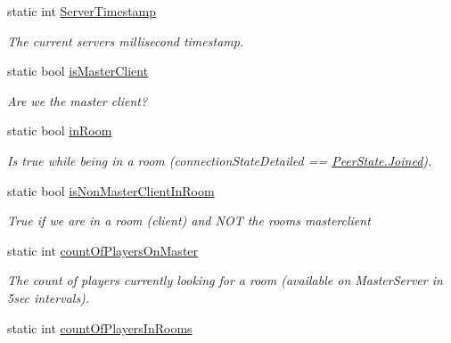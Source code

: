 \begin{DoxyCompactItemize}
static int \hyperlink{class_photon_network_aa3c3ed1a8a1da54e52c5b7284f69c8a4}{Server\+Timestamp}
\begin{DoxyCompactList}\small\item\em The current server\textquotesingle{}s millisecond timestamp. \end{DoxyCompactList}\item 
static bool \hyperlink{class_photon_network_af498064a6019a6c69e875bd64db40216}{is\+Master\+Client}
\begin{DoxyCompactList}\small\item\em Are we the master client? \end{DoxyCompactList}\item 
static bool \hyperlink{class_photon_network_a4f968278990dea7202b04eed1f833b6c}{in\+Room}
\begin{DoxyCompactList}\small\item\em Is true while being in a room (connection\+State\+Detailed == \hyperlink{group__public_api_gga91cc003c03acb26c6f1530440ebdbc88a7d50c09f1ad7d098e0a847bcdcab7efb}{Peer\+State.\+Joined}). \end{DoxyCompactList}\item 
static bool \hyperlink{class_photon_network_afbff4452088b29acf41bf3012a8d2545}{is\+Non\+Master\+Client\+In\+Room}
\begin{DoxyCompactList}\small\item\em True if we are in a room (client) and N\+OT the room\textquotesingle{}s masterclient \end{DoxyCompactList}\item 
static int \hyperlink{class_photon_network_a1e23b1e0ff44046e6532c8588ac08140}{count\+Of\+Players\+On\+Master}
\begin{DoxyCompactList}\small\item\em The count of players currently looking for a room (available on Master\+Server in 5sec intervals). \end{DoxyCompactList}\item 
static int \hyperlink{class_photon_network_a8830a7a4b92490f7882780630b1fcf99}{count\+Of\+Players\+In\+Rooms}

\end{DoxyCompactItemize}
